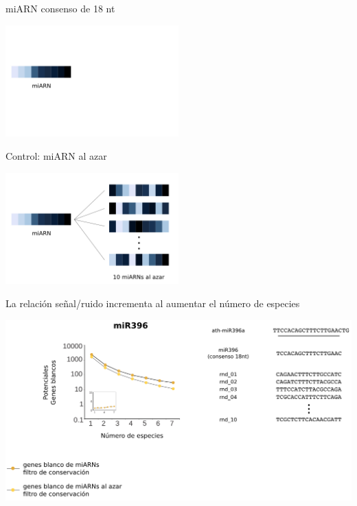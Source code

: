 \documentclass{beamer}
\begin{document}
\begin{frame}{miARN consenso de 18 nt}
	\begin{center}
		\includegraphics[width=0.5\textwidth]{img/shuffle_01.png}
	\end{center}
\end{frame}

\begin{frame}{Control: miARN al azar}
	\begin{center}
		\includegraphics[width=0.5\textwidth]{img/shuffle_02.png}
	\end{center}
\end{frame}

\begin{frame}{La relación señal/ruido incrementa al aumentar el número de especies}
	\begin{center}
		\includegraphics[width=1\textwidth]{img/NAR_fig2_02.png}
	\end{center}
\end{frame}
\end{document}
